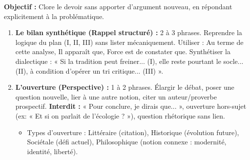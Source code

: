 \documentclass[11pt]{article}
\newcommand{\cle}[1]{{\popxbold\color{popdark}#1}}
\begin{document}
\begin{methode}
\textbf{Objectif :} Clore le devoir sans apporter d'argument nouveau, en répondant explicitement à la problématique.
\begin{enumerate}
    \item \textbf{Le bilan synthétique (Rappel structuré) :} 2 à 3 phrases. Reprendre la logique du plan (I, II, III) sans lister mécaniquement. Utiliser : \cle{Au terme de cette analyse}, \cle{Il apparaît que}, \cle{Force est de constater que}. Synthétiser la dialectique : « Si la tradition peut freiner... (I), elle reste pourtant le socle... (II), à condition d'opérer un tri critique... (III) ».
    \item \textbf{L'ouverture (Perspective) :} 1 à 2 phrases. Élargir le débat, poser une question nouvelle, lier à une autre notion, citer un auteur/proverbe prospectif. \textbf{Interdit :} « Pour conclure, je dirais que... », ouverture hors-sujet (ex: « Et si on parlait de l'écologie ? »), question rhétorique sans lien.
    \begin{itemize}
        \item \cle{Types d'ouverture :} Littéraire (citation), Historique (évolution future), Sociétale (défi actuel), Philosophique (notion connexe : modernité, identité, liberté).
    \end{itemize}
\end{enumerate}
\end{methode}
\end{document}
